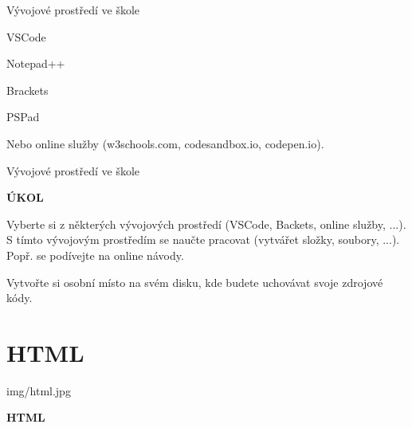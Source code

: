 \documentclass[aspectratio=1610]{beamer}
\begin{document}
\begin{frame}{Vývojové prostředí ve škole}
    \begin{cardTiny}
        \begin{flushleft}
            VSCode

            \vspace{3ex}
            Notepad++

            \vspace{3ex}
            Brackets

            \vspace{3ex}
            PSPad

            \vspace{3ex}
            Nebo online služby (w3schools.com, codesandbox.io, codepen.io).
        \end{flushleft}
    \end{cardTiny}
\end{frame}

\begin{frame}{Vývojové prostředí ve škole}
    \begin{cardTiny}
        \begin{center}
            \textbf{ÚKOL}
        \end{center}
        \begin{flushleft}
            Vyberte si z některých vývojových prostředí (VSCode, Backets, online služby, ...). S tímto vývojovým prostředím se naučte pracovat (vytvářet složky, soubory, ...). Popř. se podívejte na online návody.
            
            \vspace{2ex}
            Vytvořte si osobní místo na svém disku, kde budete uchovávat svoje zdrojové kódy.
        \end{flushleft}
    \end{cardTiny}
\end{frame}



\section{HTML}

\begin{frameImg}[width]{img/html.jpg}
    \vspace*{60mm}
    \begin{cardTiny}
        \vspace*{\fill}
        \begin{center}
            \textbf{HTML}
        \end{center}
    \end{cardTiny}
\end{frameImg}
\end{document}
